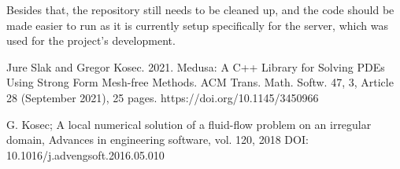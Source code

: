 \documentclass{article}
\begin{document}
Besides that, the repository still needs to be cleaned up, and the code should be made easier to run
as it is currently setup specifically for the server, which was used for the project's development. 
\begin{thebibliography}{99}
     Jure Slak and Gregor Kosec. 2021. Medusa: A C++ Library
    for Solving PDEs Using Strong Form Mesh-free Methods. ACM Trans. Math. Softw. 47,
    3, Article 28 (September 2021), 25 pages. https://doi.org/10.1145/3450966

     G. Kosec; A local numerical solution of a fluid-flow problem
    on an irregular domain, Advances in engineering software, vol. 120, 2018
    DOI: 10.1016/j.advengsoft.2016.05.010
\end{thebibliography}
\end{document}
